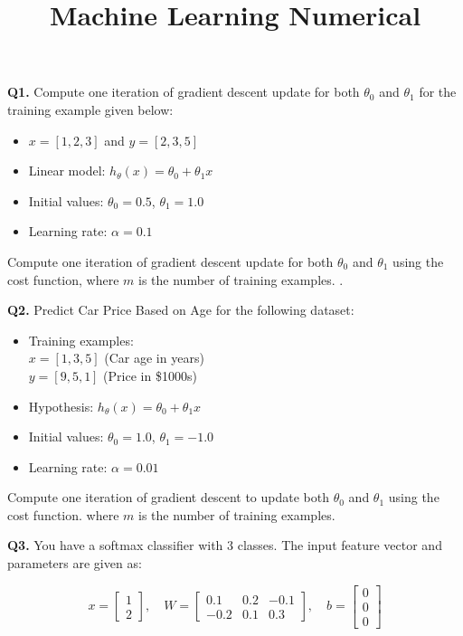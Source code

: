 \documentclass{article}
\title{Machine Learning Numerical}
\begin{document}
\textbf{Q1.} Compute one iteration of gradient descent update for both $\theta_0$ and $\theta_1$ for the training example given below:

\begin{itemize}
  \item $x = [1, 2, 3]$ and $y = [2, 3, 5]$
  \item Linear model: $h_\theta(x) = \theta_0 + \theta_1 x$
  \item Initial values: $\theta_0 = 0.5$, $\theta_1 = 1.0$
  \item Learning rate: $\alpha = 0.1$
\end{itemize}

Compute one iteration of gradient descent update for both $\theta_0$ and $\theta_1$ using the cost function, where $m$ is the number of training examples. .

\vspace{1\baselineskip}

\textbf{Q2.} Predict Car Price Based on Age for the following dataset:

\begin{itemize}
  \item Training examples: \\
  $x = [1, 3, 5]$ \hfill(Car age in years) \\
  $y = [9, 5, 1]$ \hfill (Price in \$1000s)
  \item Hypothesis: $h_\theta(x) = \theta_0 + \theta_1 x$
  \item Initial values: $\theta_0 = 1.0$, $\theta_1 = -1.0$
  \item Learning rate: $\alpha = 0.01$
\end{itemize}

Compute one iteration of gradient descent to update both $\theta_0$ and $\theta_1$ using the cost function. where $m$ is the number of training examples.

\vspace{1\baselineskip}

\textbf{Q3.} You have a softmax classifier with 3 classes. The input feature vector and parameters are given as:

\[
x = 
\begin{bmatrix}
1 \\
2
\end{bmatrix}, \quad
W = 
\begin{bmatrix}
0.1 & 0.2 & -0.1 \\
-0.2 & 0.1 & 0.3
\end{bmatrix}, \quad
b = 
\begin{bmatrix}
0 \\
0 \\
0
\end{bmatrix}
\]
\end{document}

